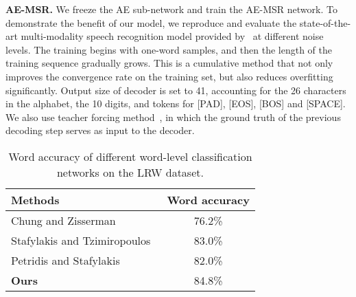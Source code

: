 \documentclass[10pt,twocolumn,letterpaper]{article}
\begin{document}
{\bf AE-MSR.} We freeze the AE sub-network and train the AE-MSR network. To demonstrate the benefit of our model, we reproduce and evaluate the state-of-the-art multi-modality speech recognition model provided by~\cite{Triantafyllos-avsr2018} at different noise levels. The training begins with one-word samples, and then the length of the training sequence gradually grows. This is a cumulative method that not only improves the convergence rate on the training set, but also reduces overfitting significantly. Output size of decoder is set to 41, accounting for the 26 characters in the alphabet, the 10 digits, and tokens for [PAD], [EOS], [BOS] and [SPACE]. We also use teacher forcing method~\cite{Triantafyllos-avsr2018}, in which the ground truth of the previous decoding step serves as input to the decoder.
\begin{table}[t]
\begin{center}
\begin{tabular}{|l|c|}
\hline
{\bf Methods} & {\bf Word accuracy} \\
\hline\hline
Chung and Zisserman~\cite{chung2017lip} & 76.2\% \\
\hline
Stafylakis and Tzimiropoulos~\cite{stafylakis2017combining} & 83.0\% \\
\hline
Petridis and Stafylakis~\cite{petridis2018end} & 82.0\% \\
\hline
{\bf Ours} & 84.8\%\\
\hline
\end{tabular}
\end{center}
\caption{Word accuracy of different word-level classification networks on the LRW dataset.}
\label{table_classify}
\end{table}\\
\begin{table}[t]
\renewcommand\tabcolsep{2pt}
\begin{center}
\end{center}
\caption{Word error rates (WER) of both single modality speech recognition and multi-modality speech recognition (MSR) on the LRS3-TED dataset. {\bf M:} modality. {\bf A:} audio modality only; {\bf V:} visual modality only.}
\label{avsr-wer}
\end{table}
\end{document}
